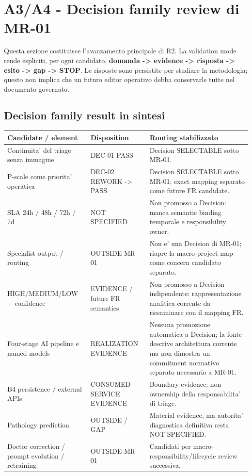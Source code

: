 \documentclass[11pt,a4paper]{article}
\begin{document}

\section{A3/A4 - Decision family review di MR-01}

Questa sezione costituisce l'avanzamento principale di R2. La validation mode rende espliciti, per ogni candidato, \textbf{domanda -> evidence -> risposta -> esito -> gap -> STOP}. Le risposte sono persistite per studiare la metodologia; questo non implica che un futuro editor operativo debba conservarle tutte nel documento governato.

\subsection{Decision family result in sintesi}

\begin{longtable}{L{48mm}L{31mm}L{78mm}}
\toprule
\textbf{Candidate / element} & \textbf{Disposition} & \textbf{Routing stabilizzato} \\
\midrule
\endhead
Continuita' del triage senza immagine & DEC-01 PASS & Decision SELECTABLE sotto MR-01. \\
P-scale come priorita' operativa & DEC-02 REWORK -> PASS & Decision SELECTABLE sotto MR-01; exact mapping separato come future FR candidate. \\
SLA 24h / 48h / 72h / 7d & NOT SPECIFIED & Non promosso a Decision: manca semantic binding temporale e responsibility owner. \\
Specialist output / routing & OUTSIDE MR-01 & Non e' una Decision di MR-01; riapre la macro project map come concern candidato separato. \\
HIGH/MEDIUM/LOW + confidence & EVIDENCE / future FR semantics & Non promosso a Decision indipendente: rappresentazione analitica corrente da riesaminare con il mapping FR. \\
Four-stage AI pipeline e named models & REALIZATION EVIDENCE & Nessuna promozione automatica a Decision; la fonte descrive architettura corrente ma non dimostra un commitment normativo separato necessario a MR-01. \\
B4 persistence / external APIs & CONSUMED SERVICE EVIDENCE & Boundary evidence; non ownership della responsabilita' di triage. \\
Pathology prediction & OUTSIDE / GAP & Material evidence, ma autorita' diagnostica definitiva resta NOT SPECIFIED. \\
Doctor correction / prompt evolution / retraining & OUTSIDE MR-01 & Candidati per macro-responsibility/lifecycle review successiva. \\
\bottomrule
\end{longtable}
\end{document}
